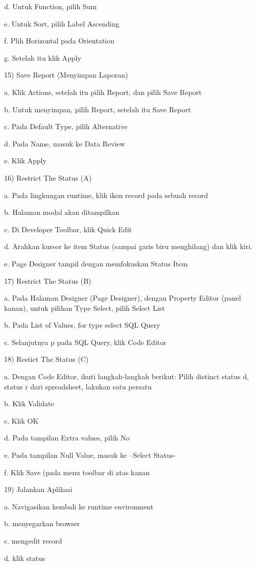 d.	Untuk Function, pilih Sum

e.	Untuk Sort, pilih Label Ascending

f.	Plih Horizontal pada Orientation

g.	Setelah itu klik Apply
\newline

15) Save Report (Menyimpan Laporan)

a.	Klik Actions, setelah itu pilih Report, dan pilih Save Report

b.	Untuk menyimpan, pilih Report, setelah itu Save Report

c.	Pada Default Type, pilih Alternative

d.	Pada Name, masuk ke Data Review

e.	Klik Apply
\newline

16) Restrict The Status (A)

a.	Pada lingkungan runtime, klik ikon record  pada sebuah record

b.	Halaman modal akan ditampilkan

c.	Di Developer Toolbar, klik Quick Edit

d.	Arahkan kursor ke item Status (sampai garis biru menghilang) dan klik kiri.

e.	Page Designer tampil dengan memfokuskan Status Item
\newline

17) Restrict The Status (B)

a.	Pada Halaman Designer (Page Designer), dengan Property Editor (panel kanan), untuk   pilihan Type Select, pilih Select List

b.	Pada List of Values, for type select SQL Query

c.	Selanjutnya p pada SQL Query, klik Code Editor
\newline

18) Restict The Status (C)

a.	Dengan Code Editor, ikuti langkah-langkah berikut:
    Pilih distinct status d, status r dari spreadsheet, lakukan satu persatu

b.	Klik  Validate

c.	Klik OK

d.	Pada tampilan Extra values, pilih No

e.	Pada tampilan Null Value, masuk ke –Select Status-

f.	Klik Save (pada menu toolbar di atas kanan
\newline

19) Jalankan Aplikasi

a. Navigasikan kembali ke runtime environment

b. menyegarkan browser

c. mengedit record

d. klik status
\newline


\begin{enumerate}


\end{enumerate}
